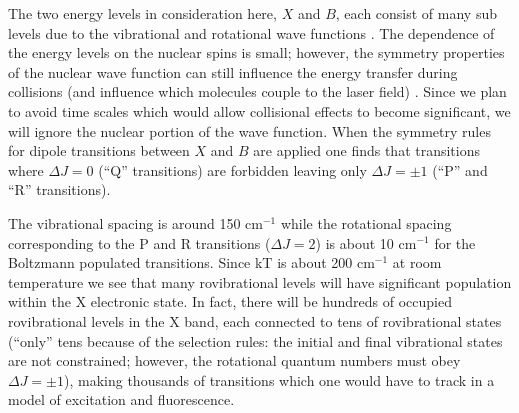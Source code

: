 \label{iodine levels section}
The two energy levels in consideration here, $X$ and $B$, each consist of many sub levels due to the vibrational and rotational wave functions \cite{Herzberg:1950a}. The dependence of the energy levels on the nuclear spins is small; however, the symmetry properties of the nuclear wave function can still influence the energy transfer during collisions (and influence which molecules couple to the laser field) \cite{Sikora:1997a}. Since we plan to avoid time scales which would allow collisional effects to become significant, we will ignore the nuclear portion of the wave function. When the symmetry rules for dipole transitions between $X$ and $B$ are applied one finds that transitions where $\Delta J=0$ (``Q'' transitions) are forbidden leaving only $\Delta J = \pm 1$ (``P'' and ``R'' transitions).

The vibrational spacing is around 150 cm$^{-1}$ while the rotational spacing corresponding to the P and R transitions ($\Delta J = 2$) is about 10 cm$^{-1}$ for the Boltzmann populated transitions. Since kT is about 200 cm$^{-1}$ at room temperature we see that many rovibrational levels will have significant population within the X electronic state. In fact, there will be hundreds of occupied rovibrational levels in the X band, each connected to tens of rovibrational states (``only'' tens because of the selection rules: the initial and final vibrational states are not constrained; however, the rotational quantum numbers must obey $\Delta J = \pm1$), making thousands of transitions which one would have to track in a model of excitation and fluorescence.

